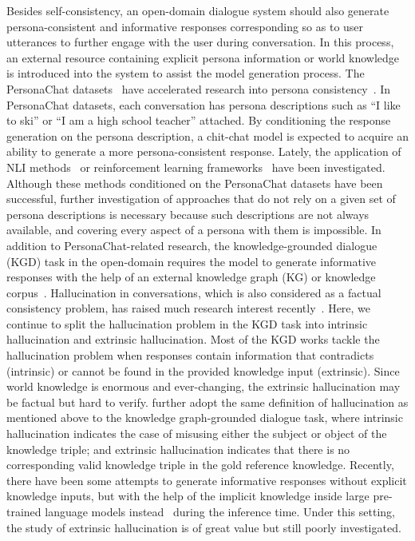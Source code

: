 Besides self-consistency, an open-domain dialogue system should also generate persona-consistent and informative responses corresponding so as to user utterances to further engage with the user during conversation. In this process, an external resource containing explicit persona information or world knowledge is introduced into the system to assist the model generation process.
The PersonaChat datasets~ have accelerated research into persona consistency~. In PersonaChat datasets, each conversation has persona descriptions such as ``I like to ski'' or ``I am a high school teacher'' attached. By conditioning the response generation on the persona description, a chit-chat model is expected to acquire an ability to generate a more persona-consistent response. Lately, the application of NLI methods~ or reinforcement learning frameworks~ have been investigated. Although these methods conditioned on the PersonaChat datasets have been successful, further investigation of approaches that do not rely on a given set of persona descriptions is necessary because such descriptions are not always available, and covering every aspect of a persona with them is impossible. 
In addition to PersonaChat-related research, the knowledge-grounded dialogue (KGD) task in the open-domain requires the model to generate informative responses with the help of an external knowledge graph (KG) or knowledge corpus~. Hallucination in conversations, which is also considered as a factual consistency problem, has raised much research interest recently~. Here, we continue to split the hallucination problem in the KGD task into intrinsic hallucination and extrinsic hallucination. Most of the KGD works tackle the hallucination problem when responses contain information that contradicts (intrinsic) or cannot be found in the provided knowledge input (extrinsic). 
Since world knowledge is enormous and ever-changing, the extrinsic hallucination may be factual but hard to verify.  further adopt the same definition of hallucination as mentioned above to the knowledge graph-grounded dialogue task, where intrinsic hallucination indicates the case of misusing either the subject or object of the knowledge triple; 
and extrinsic hallucination indicates that there is no corresponding valid knowledge triple in the gold reference knowledge.
Recently, there have been some attempts to generate informative responses without explicit knowledge inputs, but with the help of the implicit knowledge inside large pre-trained language models instead~ during the inference time. Under this setting, the study of extrinsic hallucination is of great value but still poorly investigated.

